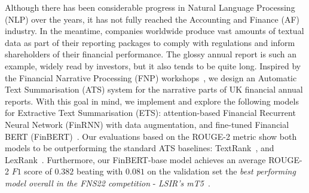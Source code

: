 Although there has been considerable progress in Natural Language Processing (NLP) over the years, it has not fully reached the Accounting and Finance (AF) industry.
In the meantime, companies worldwide produce vast amounts of textual data as part of their reporting packages to comply with regulations and inform shareholders of their financial performance.
The glossy annual report is such an example, widely read by investors, but it also tends to be quite long.
Inspired by the Financial Narrative Processing (FNP) workshops~\cite{zmandar-etal-2021-financial, fnp-2022-financial},
we design an Automatic Text Summarisation (ATS) system for the narrative parts of UK financial annual reports.
With this goal in mind, we implement and explore the following models for Extractive Text Summarisation (ETS):
attention-based Financial Recurrent Neural Network (FinRNN) with data augmentation, and fine-tuned Financial BERT (FinBERT)~\cite{yang2020finbert}.
Our evaluations based on the ROUGE-2 metric show both models to be outperforming the standard ATS baselines: TextRank~\cite{mihalcea-tarau-2004-textrank}, and LexRank~\cite{Erkan2004LexRankGC}.
Furthermore, our FinBERT-base model achieves an average ROUGE-2 $F1$ score of $0.382$ beating with $0.081$ on the
validation set the \emph{best performing model overall in the FNS22 competition} - \emph{LSIR's mT5}~\cite{foroutan-etal-2022-multilingual}.
